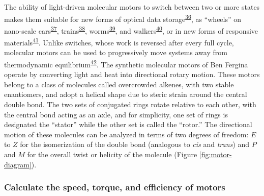 \documentclass[11pt,notitlepage]{article}
\begin{document}
The ability of light-driven molecular motors to switch between two or
more states makes them suitable for new forms of optical data
storage\textsuperscript{\protect\hyperlink{ref-18PGyWtWV}{36}}, as
``wheels'' on nano-scale
cars\textsuperscript{\protect\hyperlink{ref-OAnfwOYX}{37}},
trains\textsuperscript{\protect\hyperlink{ref-10MPrT2Vf}{38}},
worms\textsuperscript{\protect\hyperlink{ref-Tels98bO}{39}}, and
walkers\textsuperscript{\protect\hyperlink{ref-SfUEsk0e}{40}}, or in new
forms of responsive
materials\textsuperscript{\protect\hyperlink{ref-jCuccJLJ}{41}}. Unlike
switches, whose work is reversed after every full cycle, molecular
motors can be used to progressively move systems away from thermodynamic
equilibrium\textsuperscript{\protect\hyperlink{ref-1H5r7SBir}{42}}. The
synthetic molecular motors of Ben Fergina operate by converting light
and heat into directional rotary motion. These motors belong to a class
of molecules called overcrowded alkenes, with two stable enantiomers,
and adopt a helical shape due to steric strain around the central double
bond. The two sets of conjugated rings rotate relative to each other,
with the central bond acting as an axle, and for simplicity, one set of
rings is designated the ``stator'' while the other set is called the
``rotor.'' The directional motion of these molecules can be analyzed in
terms of two degrees of freedom: \(E\) to \(Z\) for the isomerization of
the double bond (analogous to \emph{cis} and \emph{trans}) and \(P\) and
\(M\) for the overall twist or helicity of the molecule (Figure
\ref{fig:motor-diagram}).

\hypertarget{calculate-the-speed-torque-and-efficiency-of-motors}{%
\subsubsection{Calculate the speed, torque, and efficiency of
motors}\label{calculate-the-speed-torque-and-efficiency-of-motors}}
\end{document}
